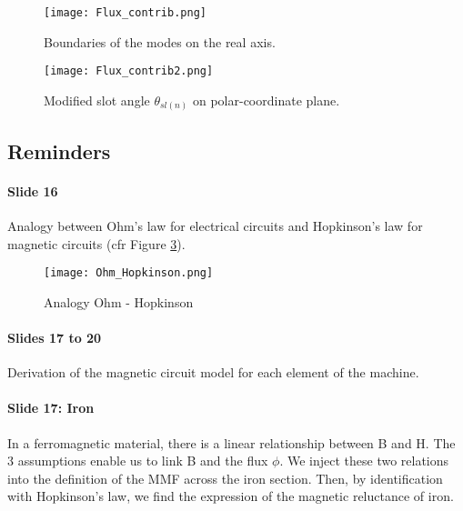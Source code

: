 \begin{figure}[H]
    \centering
    \texttt{[image: Flux\_contrib.png]}
    \caption{Boundaries of the modes on the real axis.}
    \label{fig:boundaries}
\end{figure}
\begin{figure}[H]
    \centering
    \texttt{[image: Flux\_contrib2.png]}
    \caption{Modified slot angle $\theta_{sl(n)}$ on polar-coordinate plane.}
    \label{fig:modified_slot_angle}
\end{figure}

\subsection{Reminders}

\paragraph{Slide 16}
Analogy between Ohm's law for electrical circuits and Hopkinson's law for magnetic circuits (cfr Figure \ref{fig:Hopkinson}).
\begin{figure}[H]
    \centering
    \texttt{[image: Ohm\_Hopkinson.png]}
    \caption{Analogy Ohm - Hopkinson}
    \label{fig:Hopkinson}
\end{figure}

\paragraph{Slides 17 to 20}
Derivation of the magnetic circuit model for each element of the machine.

\paragraph{Slide 17: Iron}
In a ferromagnetic material, there is a linear relationship between B and H.
The 3 assumptions enable us to link B and the flux $\phi$.
We inject these two relations into the definition of the MMF across the iron section.
Then, by identification with Hopkinson's law, we find the expression of the magnetic reluctance of iron.

